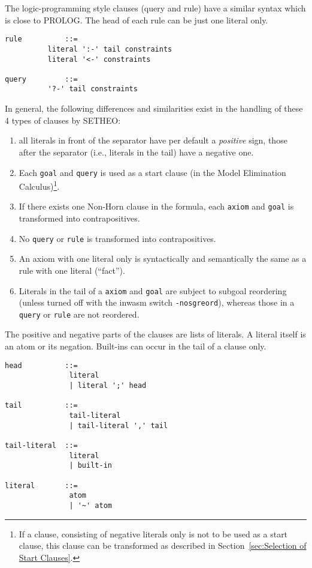 The logic-programming style clauses (query and rule) have a
similar syntax which is close to PROLOG. The head of each rule
can be just one literal only.
\begin{verbatim}
rule          ::=
	      literal ':-' tail constraints
	      literal '<-' constraints

query         ::=
	      '?-' tail constraints
\end{verbatim}


In general, the following differences and similarities
exist in the handling of these 4 types of clauses by SETHEO:
\begin{enumerate}
\item
all literals in front of the separator have per default
a {\em positive\/} sign, those after the separator (i.e., literals
in the tail) have a negative one.
\item
Each {\tt goal} and {\tt query} is used as a start clause 
(in the Model Elimination Calculus)\footnote{
	If a clause, consisting of negative literals only is not
	to be used as a start clause, this clause can be transformed
	as described in Section~\ref{sec:Selection of Start Clauses}.
	}.
\item
If there exists one Non-Horn clause in the formula, each
{\tt axiom} and {\tt goal} is transformed into contrapositives.
\item
No {\tt query} or {\tt rule} is transformed into contrapositives.
\item
An axiom with one literal only is syntactically and semantically
the same as a rule with one literal (``fact'').
\item
Literals in the tail of a
{\tt axiom} and {\tt goal} are subject to subgoal reordering
(unless turned off with the inwasm switch {\tt -nosgreord}),
whereas those in a
{\tt query} or  {\tt rule} are not reordered.
\end{enumerate}


The positive and negative parts of the clauses are lists
of literals. A literal itself is an atom or its negation.
Built-ins can occur in the tail of a clause only.
\begin{verbatim}
head          ::=
               literal
               | literal ';' head

tail          ::=
               tail-literal
               | tail-literal ',' tail

tail-literal  ::=
               literal
               | built-in

literal       ::=
               atom
               | '~' atom
\end{verbatim}

